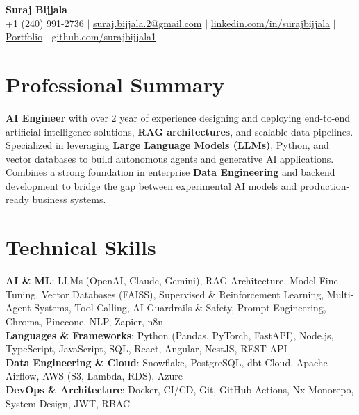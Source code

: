 \documentclass[letterpaper,11pt]{article}
\begin{document}
\begin{center}
    \textbf{ \huge Suraj Bijjala} \\ \vspace{2pt}
    \small
    +1 (240) 991-2736 $|$
    \href{mailto:suraj.bijjala.2@gmail.com}{{suraj.bijjala.2@gmail.com}} $|$
    \href{https://www.linkedin.com/in/surajbijjala}{{linkedin.com/in/surajbijjala}} $|$
    \href{https://www.datascienceportfol.io/surajbijjala}{Portfolio} $|$ \href{https://github.com/surajbijjala1}{{github.com/surajbijjala1}}
\end{center}

\vspace{-18pt}

\section{Professional Summary}
\small{
 \textbf{AI Engineer} with over 2 year of experience designing and deploying end-to-end artificial intelligence solutions, \textbf{RAG architectures}, and scalable data pipelines. Specialized in leveraging \textbf{Large Language Models (LLMs)}, Python, and vector databases to build autonomous agents and generative AI applications. Combines a strong foundation in enterprise \textbf{Data Engineering} and backend development to bridge the gap between experimental AI models and production-ready business systems.
}
\vspace{-8pt}

\section{Technical Skills}
\small{
\linespread{1.15}\selectfont
 \textbf{AI \& ML}{: LLMs (OpenAI, Claude, Gemini), RAG Architecture, Model Fine-Tuning, Vector Databases (FAISS), Supervised \& Reinforcement Learning, Multi-Agent Systems, Tool Calling, AI Guardrails \& Safety, Prompt Engineering, Chroma, Pinecone, NLP, Zapier, n8n} \\
 \textbf{Languages \& Frameworks}{: Python (Pandas, PyTorch, FastAPI), Node.js, TypeScript, JavaScript, SQL, React, Angular, NestJS, REST API} \\
 \textbf{Data Engineering \& Cloud}{: Snowflake, PostgreSQL, dbt Cloud, Apache Airflow, AWS (S3, Lambda, RDS), Azure} \\
 \textbf{DevOps \& Architecture}{: Docker, CI/CD, Git, GitHub Actions, Nx Monorepo, System Design, JWT, RBAC}
}
\vspace{-8pt}
\end{document}
